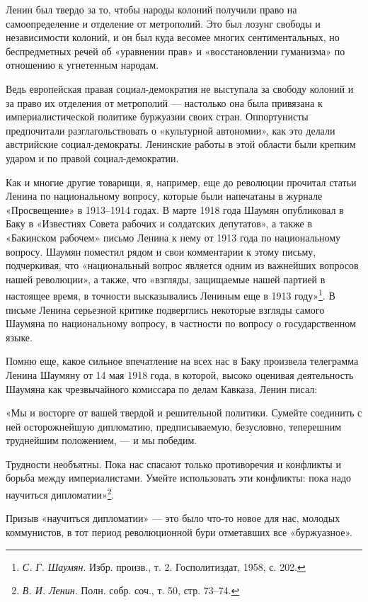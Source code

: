 \documentclass[12pt, a4paper, openany]{book}
\begin{document}
Ленин был твердо за то, чтобы народы колоний получили право на самоопределение и отделение от метрополий. Это был лозунг свободы и независимости колоний, и он был куда весомее многих сентиментальных, но беспредметных речей об «уравнении прав» и «восстановлении гуманизма» по отношению к угнетенным народам.

Ведь европейская правая социал-демократия не выступала за свободу колоний и за право их отделения от метрополий — настолько она была привязана к империалистической политике буржуазии своих стран. Оппортунисты предпочитали разглагольствовать о «культурной автономии», как это делали австрийские социал-демократы. Ленинские работы в этой области были крепким ударом и по правой социал-демократии.

Как и многие другие товарищи, я, например, еще до революции прочитал статьи Ленина по национальному вопросу, которые были напечатаны в журнале «Просвещение» в 1913–1914 годах. В марте 1918 года Шаумян опубликовал в Баку в «Известиях Совета рабочих и солдатских депутатов», а также в «Бакинском рабочем» письмо Ленина к нему от 1913 года по национальному вопросу. Шаумян поместил рядом и свои комментарии к этому письму, подчеркивая, что «национальный вопрос является одним из важнейших вопросов нашей революции», а также, что «взгляды, защищаемые нашей партией в настоящее время, в точности высказывались Лениным еще в 1913 году»\footnote{\textit{С. Г. Шаумян}. Избр. произв., т. 2. Госполитиздат, 1958, с. 202.}. В письме Ленина серьезной критике подверглись некоторые взгляды самого Шаумяна по национальному вопросу, в частности по вопросу о государственном языке.

Помню еще, какое сильное впечатление на всех нас в Баку произвела телеграмма Ленина Шаумяну от 14 мая 1918 года, в которой, высоко оценивая деятельность Шаумяна как чрезвычайного комиссара по делам Кавказа, Ленин писал:

«Мы и восторге от вашей твердой и решительной политики. Сумейте соединить с ней осторожнейшую дипломатию, предписываемую, безусловно, теперешним труднейшим положением, — и мы победим.

Трудности необъятны. Пока нас спасают только противоречия и конфликты и борьба между империалистами. Умейте использовать эти конфликты: пока надо научиться дипломатии»\footnote{\textit{В. И. Ленин}. Полн. собр. соч., т. 50, стр. 73–74.}.

Призыв «научиться дипломатии» — это было что-то новое для нас, молодых коммунистов, в тот период революционной бури отметавших все «буржуазное».
\end{document}

